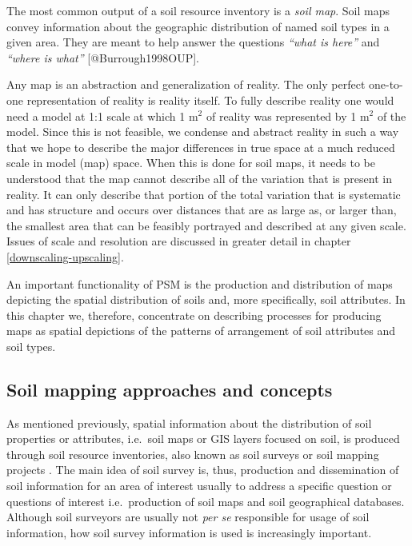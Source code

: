 \documentclass[11pt]{krantz}
\makeatletter
\newenvironment{kframe}{%
\medskip{}
\setlength{\fboxsep}{.8em}
 \def\at@end@of@kframe{}%
 \ifinner\ifhmode%
  \def\at@end@of@kframe{\end{minipage}}%
  \begin{minipage}{\columnwidth}%
 \fi\fi%
 \def\FrameCommand##1{\hskip\@totalleftmargin \hskip-\fboxsep
 \colorbox{shadecolor}{##1}\hskip-\fboxsep
     \hskip-\linewidth \hskip-\@totalleftmargin \hskip\columnwidth}%
 \MakeFramed {\advance\hsize-\width
   \@totalleftmargin\z@ \linewidth\hsize
   \@setminipage}}%
 {\par\unskip\endMakeFramed%
 \at@end@of@kframe}
\newenvironment{rmdblock}[1]
  {
  \begin{itemize}
  \renewcommand{\labelitemi}{
    \raisebox{-.7\height}[0pt][0pt]{
      {\setkeys{Gin}{width=3em,keepaspectratio}\texttt{[image: images/\#1]}}
    }
  }
  \setlength{\fboxsep}{1em}
  \begin{kframe}
  \item
  }
  {
  \end{kframe}
  \end{itemize}
  }
\newenvironment{rmdnote}
  {\begin{rmdblock}{note}}
  {\end{rmdblock}}
\theoremstyle{definition}
\theoremstyle{definition}
\theoremstyle{definition}
\theoremstyle{remark}
\makeatother
\begin{document}
\begin{rmdnote}
The most common output of a soil resource inventory is a \emph{soil
map}. Soil maps convey information about the geographic distribution of
named soil types in a given area. They are meant to help answer the
questions \emph{``what is here''} and \emph{``where is what''}
{[}@Burrough1998OUP{]}.
\end{rmdnote}

Any map is an abstraction and generalization of reality. The only
perfect one-to-one representation of reality is reality itself. To fully
describe reality one would need a model at 1:1 scale at which 1 m\(^2\)
of reality was represented by 1 m\(^2\) of the model. Since this is not
feasible, we condense and abstract reality in such a way that we hope to
describe the major differences in true space at a much reduced scale in
model (map) space. When this is done for soil maps, it needs to be
understood that the map cannot describe all of the variation that is
present in reality. It can only describe that portion of the total
variation that is systematic and has structure and occurs over distances
that are as large as, or larger than, the smallest area that can be
feasibly portrayed and described at any given scale. Issues of scale and
resolution are discussed in greater detail in chapter
\ref{downscaling-upscaling}.

An important functionality of PSM is the production and distribution of
maps depicting the spatial distribution of soils and, more specifically,
soil attributes. In this chapter we, therefore, concentrate on
describing processes for producing maps as spatial depictions of the
patterns of arrangement of soil attributes and soil types.

\hypertarget{soil-mapping-approaches-and-concepts}{%
\subsection{Soil mapping approaches and
concepts}\label{soil-mapping-approaches-and-concepts}}

As mentioned previously, spatial information about the distribution of
soil properties or attributes, i.e.~soil maps or GIS layers focused on
soil, is produced through soil resource inventories, also known as soil
surveys or soil mapping projects
\citep{Burrough1971, Avery1987, Wysocki2005Geoderma, Legros2006SP}. The
main idea of soil survey is, thus, production and dissemination of soil
information for an area of interest usually to address a specific
question or questions of interest i.e.~production of soil maps and soil
geographical databases. Although soil surveyors are usually not
\emph{per se} responsible for usage of soil information, how soil survey
information is used is increasingly important.
\end{document}
